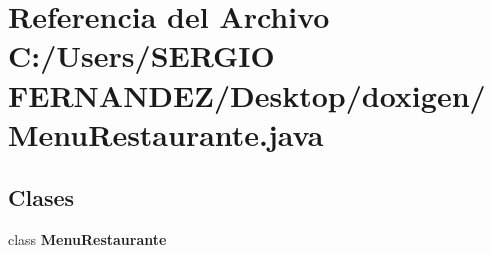 \section{Referencia del Archivo C:/Users/SERGIO FERNANDEZ/Desktop/doxigen/MenuRestaurante.java}
\label{_menu_restaurante_8java}
\subsection*{Clases}
\begin{CompactItemize}
\item 
class {\bf MenuRestaurante}
\end{CompactItemize}
